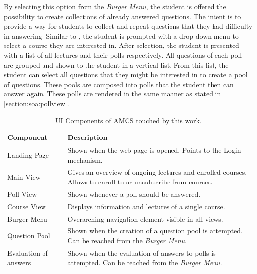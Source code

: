 By selecting this option from the \emph{Burger Menu}, the student is offered the possibility to create collections of already answered questions. The intent is to provide a way for students to collect and repeat questions that they had difficulty in answering.
Similar to \todosct, the student is prompted with a drop down menu to select a course they are interested in. After selection, the student is presented with a list of all lectures and their polls respectively. All questions of each poll are grouped and shown to the student in a vertical list. From this list, the student can select all questions that they might be interested in to create a pool of questions.
These pools are composed into polls that the student then can answer again. These polls are rendered in the same manner as stated in \autoref{section:soa:pollview}.

\begin{table}[t]
	{\renewcommand{\arraystretch}{2}
		\begin{tabular}{ | p{4cm} | p{11cm} |}
			\hline
			Component & Description \\ \hline \hline
			Landing Page & Shown when the web page is opened. Points to the Login mechanism. \\ \hline
		    Main View & Gives an overview of ongoing lectures and enrolled courses. Allows to enroll to or unsubscribe from courses. \\ \hline
			Poll View & Shown whenever a poll should be answered. \\ \hline
			Course View & Displays information and lectures of a single course. \\ \hline
			Burger Menu & Overarching navigation element visible in all views. \\ \hline
			Question Pool & Shown when the creation of a question pool is attempted. Can be reached from the \emph{Burger Menu}. \\ \hline
			Evaluation of answers & Shown when the evaluation of answers to polls is attempted. Can be reached from the \emph{Burger Menu}. \\ \hline
		\end{tabular}
	}
	\caption{UI Components of AMCS touched by this work.}
	\label{tab:components}
\end{table}

